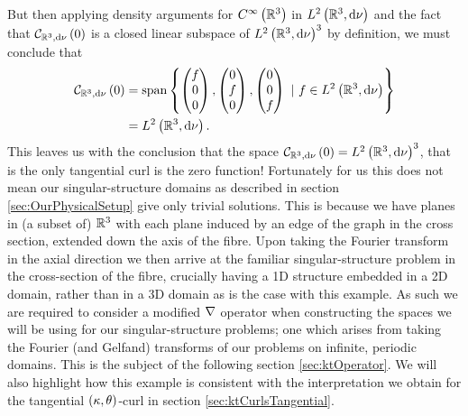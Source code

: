 But then applying density arguments for $C^{\infty}\left( \mathbb{R}^3 \right)$ in $L^{2}\left( \mathbb{R}^3,\mathrm{d}\nu \right)$ and the fact that $\mathcal{C}_{ \mathbb{R}^3, \mathrm{d}\nu}\left( 0 \right)$ is a closed linear subspace of $L^{2}\left( \mathbb{R}^3,\mathrm{d}\nu \right)^3$ by definition, we must conclude that
\begin{align*}
	\mathcal{C}_{ \mathbb{R}^3, \mathrm{d}\nu}\left( 0 \right) &= \mathrm{span}\left\{ 	
	\begin{pmatrix}	f \\ 0 \\ 0	\end{pmatrix},
	\begin{pmatrix}	0 \\ f \\ 0	\end{pmatrix},
	\begin{pmatrix}	0 \\ 0 \\ f	\end{pmatrix}
	\ \vert \ f\in L^{2}\left( \mathbb{R}^3,\mathrm{d}\nu \right)
	 \right\} \\
	&= L^{2}\left( \mathbb{R}^3,\mathrm{d}\nu \right).
\end{align*}
This leaves us with the conclusion that the space $\mathcal{C}_{ \mathbb{R}^3, \mathrm{d}\nu}\left( 0 \right) = L^{2}\left( \mathbb{R}^3,\mathrm{d}\nu \right)^3$, that is the only tangential curl is the zero function!
Fortunately for us this does not mean our singular-structure domains as described in section \ref{sec:OurPhysicalSetup} give only trivial solutions.
This is because we have planes in (a subset of) $\mathbb{R}^3$ with each plane induced by an edge of the graph in the cross section, extended down the axis of the fibre. 
Upon taking the Fourier transform in the axial direction we then arrive at the familiar singular-structure problem in the cross-section of the fibre, crucially having a 1D structure embedded in a 2D domain, rather than in a 3D domain as is the case with this example.
As such we are required to consider a modified $\nabla$ operator when constructing the spaces we will be using for our singular-structure problems; one which arises from taking the Fourier (and Gelfand) transforms of our problems on infinite, periodic domains.
This is the subject of the following section \ref{sec:ktOperator}.
We will also highlight how this example is consistent with the interpretation we obtain for the tangential $\left( \kappa, \theta \right)$-curl in section \ref{sec:ktCurlsTangential}.

